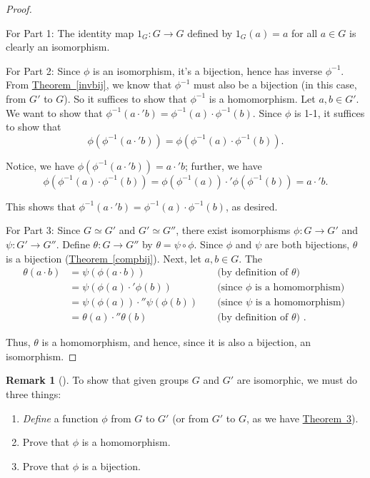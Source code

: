 \documentclass[10pt,openany,oneside]{book}
\theoremstyle{plain}
\theoremstyle{definition}
\theoremstyle{definition}
\newtheorem{remark}[theorem]{Remark}
\theoremstyle{definition}
\theoremstyle{definition}
\numberwithin{equation}{section}
\newcommand{\amp}{&}
\begin{document}
\begin{proof}\hypertarget{proof-14}{}
For Part 1: The identity map \(1_G:G\to G\) defined by \(1_G(a)=a\) for all \(a\in G\) is clearly an isomorphism.%
\par
For Part 2: Since \(\phi\) is an isomorphism, it's a bijection, hence has inverse \(\phi^{-1}\). From \hyperref[invbij]{Theorem~\ref{invbij}}, we know that \(\phi^{-1}\) must also be a bijection (in this case, from \(G'\) to \(G\)). So it suffices to show that \(\phi^{-1}\) is a homomorphism. Let \(a,b\in G'\). We want to show that \(\phi^{-1}(a\cdot'b)=\phi^{-1}(a)\cdot\phi^{-1}(b)\). Since \(\phi\) is 1-1, it suffices to show that%
\begin{equation*}
\phi(\phi^{-1}(a\cdot'b))=\phi(\phi^{-1}(a)\cdot\phi^{-1}(b)).
\end{equation*}
%
\par
Notice, we have \(\phi(\phi^{-1}(a\cdot'b))=a\cdot'b\); further, we have%
\begin{equation*}
\phi(\phi^{-1}(a)\cdot\phi^{-1}(b))=\phi(\phi^{-1}(a))\cdot'\phi(\phi^{-1}(b))=a\cdot'b.
\end{equation*}
%
\par
This shows that \(\phi^{-1}(a\cdot'b)=\phi^{-1}(a)\cdot\phi^{-1}(b)\), as desired.%
\par
For Part 3: Since \(G\simeq G'\) and \(G'\simeq G''\), there exist isomorphisms \(\phi:G\to G'\) and \(\psi:G'\to G''\). Define \(\theta:G\to G''\) by \(\theta=\psi \circ \phi\). Since \(\phi\) and \(\psi\) are both bijections, \(\theta\) is a bijection (\hyperref[compbij]{Theorem~\ref{compbij}}). Next, let \(a,b\in G\). The%
\begin{align*}
\theta(a\cdot b)\amp =\psi(\phi(a\cdot b))\amp \amp \text{ (by definition of \(\theta\)) }\\
\amp =\psi(\phi(a)\cdot'\phi(b))\amp \amp \text{ (since \(\phi\) is a homomorphism) }\\
\amp =\psi(\phi(a))\cdot''\psi(\phi(b))\amp \amp \text{ (since \(\psi\) is a homomorphism) }\\
\amp =\theta(a)\cdot''\theta(b)\amp \amp \text{ (by definition of \(\theta\)) } .
\end{align*}
%
\par
Thus, \(\theta\) is a homomorphism, and hence, since it is also a bijection, an isomorphism.%
\end{proof}
\begin{remark}[]\label{remark-18}
To show that given groups \(G\) and \(G'\) are isomorphic, we must do three things: \leavevmode%
\begin{enumerate}
\item\hypertarget{li-148}{}\emph{Define} a function \(\phi\) from \(G\) to \(G'\) (or from \(G'\) to \(G\), as we have \hyperref[groupisoequiv]{Theorem~3}).%
\item\hypertarget{li-149}{}Prove that \(\phi\) is a homomorphism.%
\item\hypertarget{li-150}{}Prove that \(\phi\) is a bijection.%
\end{enumerate}
%
\end{remark}
\end{document}
